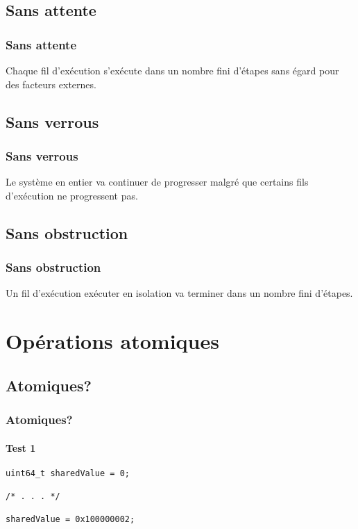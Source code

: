 \documentclass{beamer}
\begin{document}

\subsection{Sans attente}
\begin{frame}[fragile]
\frametitle{Sans attente}
Chaque fil d'exécution s'exécute dans un nombre fini d'étapes sans égard pour des facteurs externes.

\end{frame}


\subsection{Sans verrous}
\begin{frame}[fragile]
\frametitle{Sans verrous}
Le système en entier va continuer de progresser malgré que certains fils d'exécution ne progressent pas.

\end{frame}


\subsection{Sans obstruction}
\begin{frame}[fragile]
\frametitle{Sans obstruction}
Un fil d'exécution exécuter en isolation va terminer dans un nombre fini d'étapes.

\end{frame}

\section{Opérations atomiques}
\subsection{Atomiques?}
\begin{frame}[fragile]
\frametitle{Atomiques?}
\framesubtitle{Test 1}
\begin{lstlisting}
uint64_t sharedValue = 0;

/* . . . */

sharedValue = 0x100000002;
\end{lstlisting}
\end{frame}
\end{document}
